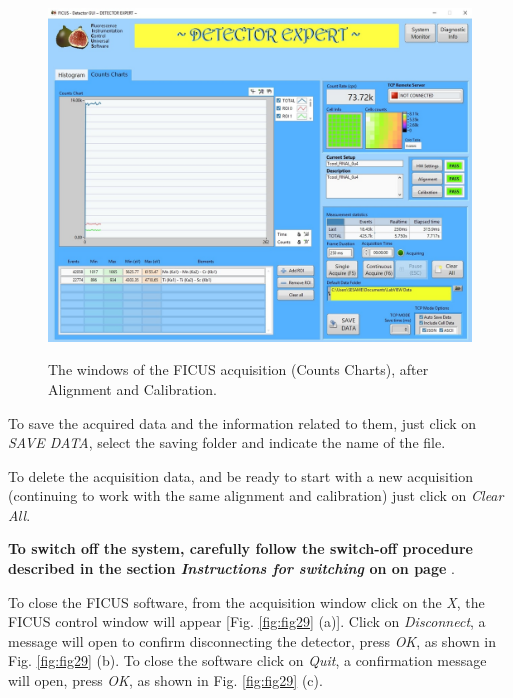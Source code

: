 \documentclass[a4paper,12pt,oneside,pdflatex,italian,final,twocolumn]{article}
\begin{document}
\begin{figure}[h]
\centering
{\includegraphics[width=.8\textwidth]{Capture44.jpg}} \quad
\caption{The windows of the FICUS acquisition (Counts Charts), after Alignment and Calibration.}\label{fig:fig26}
\end{figure}

To save the acquired data and the information related to them, just click on \textit{SAVE DATA}, select the saving folder and indicate the name of the file. 

To delete the acquisition data, and be ready to start with a new acquisition (continuing to work with the same alignment and calibration) just click on \textit{Clear All}.

\textbf{To switch off the system, carefully follow the switch-off procedure described in the section \textit{Instructions for switching} on on page \pageref{spegnimento}}. 

To close the FICUS software, from the acquisition window click on the \textit{X}, the FICUS control window will appear [Fig. \ref{fig:fig29} (a)]. Click on \textit{Disconnect}, a message will open to confirm disconnecting the detector, press \textit{OK}, as shown in Fig. \ref{fig:fig29} (b). To close the software click on \textit{Quit}, a confirmation message will open, press \textit{OK}, as shown in Fig. \ref{fig:fig29} (c).
\end{document}
